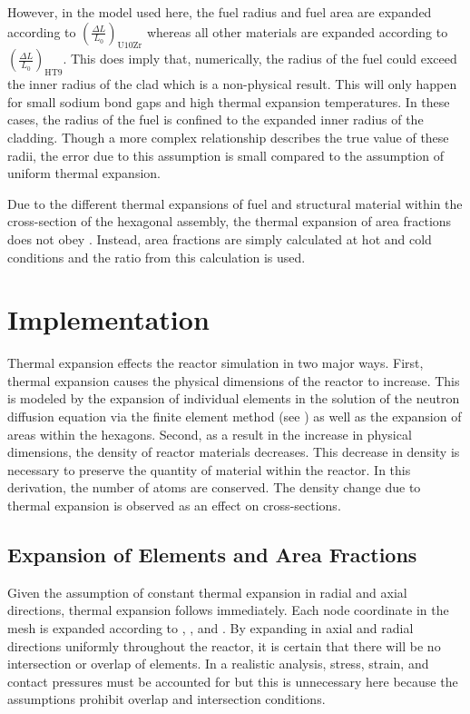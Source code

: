     However, in the model used here, the fuel radius and fuel area
    are expanded according to $\left(\frac{\Delta L}{L_0}\right)_{\text{U10Zr}}$
    whereas all other materials are expanded according to 
    $\left(\frac{\Delta L}{L_0}\right)_{\text{HT9}}$. This does imply that,
    numerically, the radius of the fuel could exceed the inner radius of the 
    clad which is a non-physical result. This will only happen for small sodium 
    bond gaps and high thermal expansion temperatures. In these cases, the 
    radius of the fuel is confined to the expanded inner radius of the cladding.
    Though a more complex relationship describes the true value of these radii, 
    the error due to this assumption is small compared to the assumption of 
    uniform thermal expansion.
    
    Due to the different thermal expansions of fuel and structural material 
    within the cross-section of the hexagonal assembly, the thermal expansion of 
    area fractions does not obey . Instead, area 
    fractions are simply calculated at hot and cold conditions and the ratio 
    from this calculation is used.

\section{Implementation}
  Thermal expansion effects the reactor simulation in two major ways. First,
  thermal expansion causes the physical dimensions of the reactor to increase. 
  This is modeled by the expansion of individual elements in the solution of the
  neutron diffusion equation via the finite element method (see
  ) as well as the expansion of areas within the 
  hexagons.  Second, as a result in the increase in physical dimensions, the 
  density of reactor materials decreases. This decrease in density is necessary
  to preserve the quantity of material within the reactor. In this derivation,
  the number of atoms are conserved. The density change due to thermal expansion 
  is observed as an effect on cross-sections.

  \subsection{Expansion of Elements and Area Fractions}
    Given the assumption of constant thermal expansion in radial and axial
    directions, thermal expansion follows immediately. Each node coordinate in
    the mesh is expanded according to , ,
    and . By expanding in axial and radial directions
    uniformly throughout the reactor, it is certain that there will be no
    intersection or overlap of elements. In a realistic analysis, stress,
    strain, and contact pressures must be accounted for but this is unnecessary
    here because the assumptions prohibit overlap and intersection conditions.

